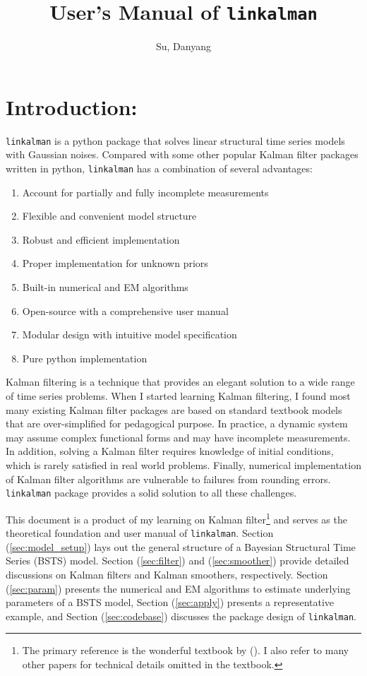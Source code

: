 \documentclass[10pt, titlepage]{article}
\title{User's Manual of \texttt{linkalman}}
\author{Su, Danyang}
\newenvironment{boenumerate}
    {\begin{enumerate}\renewcommand\labelenumi{\textbf\theenumi}}
    {\end{enumerate}}
\numberwithin{equation}{section}
\begin{document}
\maketitle
\thispagestyle{empty}
\clearpage
{}
\tableofcontents
\newpage
\section{Introduction:}
\texttt{linkalman} is a python package that solves linear structural time series models with Gaussian noises. Compared with some other popular Kalman filter packages written in python, \texttt{linkalman} has a combination of several advantages:
\begin{boenumerate}
    \item Account for partially and fully incomplete measurements 
    \item Flexible and convenient model structure
    \item Robust and efficient implementation
    \item Proper implementation for unknown priors
    \item Built-in numerical and EM algorithms
    \item Open-source with a comprehensive user manual 
    \item Modular design with intuitive model specification
    \item Pure python implementation 
\end{boenumerate}
Kalman filtering is a technique that provides an elegant solution to a wide range of time series problems. When I started learning Kalman filtering, I found most many existing Kalman filter packages are based on standard textbook models that are over-simplified for pedagogical purpose. In practice, a dynamic system may assume complex functional forms and may have incomplete measurements. In addition, solving a Kalman filter requires knowledge of initial conditions, which is rarely satisfied in real world problems. Finally, numerical implementation of Kalman filter algorithms are vulnerable to failures from rounding errors. \texttt{linkalman} package provides a solid solution to all these challenges. 

This document is a product of my learning on Kalman filter\footnote{The primary reference is the wonderful textbook by (\cite{durbin_koopman_2001}). I also refer to many other papers for technical details omitted in the textbook.} and serves as the theoretical foundation and user manual of \texttt{linkalman}. Section (\ref{sec:model_setup}) lays out the general structure of a Bayesian Structural Time Series (BSTS) model. Section (\ref{sec:filter}) and (\ref{sec:smoother}) provide detailed discussions on Kalman filters and Kalman smoothers, respectively. Section (\ref{sec:param}) presents the numerical and EM algorithms to estimate underlying parameters of a BSTS model, Section (\ref{sec:apply}) presents a representative example, and Section (\ref{sec:codebase}) discusses the package design of \texttt{linkalman}.
\end{document}
